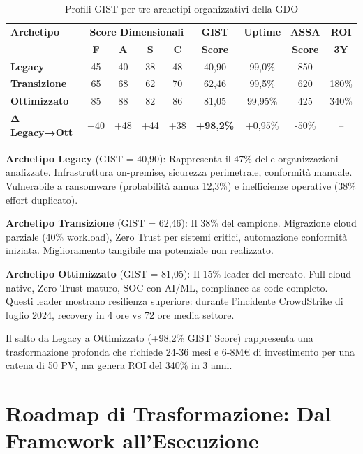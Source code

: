 \begin{table}[htbp]
\centering
\caption{Profili GIST per tre archetipi organizzativi della GDO}
\label{tab:gist_archetypes}
\begin{tabular}{@{}lcccccccc@{}}
\toprule
\textbf{Archetipo} & \multicolumn{4}{c}{\textbf{Score Dimensionali}} & \textbf{GIST} & \textbf{Uptime} & \textbf{ASSA} & \textbf{ROI} \\
& \textbf{F} & \textbf{A} & \textbf{S} & \textbf{C} & \textbf{Score} & & \textbf{Score} & \textbf{3Y} \\
\midrule
\textbf{Legacy} & 45 & 40 & 38 & 48 & 40,90 & 99,0\% & 850 & -- \\
\textbf{Transizione} & 65 & 68 & 62 & 70 & 62,46 & 99,5\% & 620 & 180\% \\
\textbf{Ottimizzato} & 85 & 88 & 82 & 86 & 81,05 & 99,95\% & 425 & 340\% \\
\midrule
\textbf{Δ Legacy→Ott} & +40 & +48 & +44 & +38 & \textbf{+98,2\%} & +0,95\% & -50\% & -- \\
\bottomrule
\end{tabular}
\end{table}

\textbf{Archetipo Legacy} (GIST = 40,90): Rappresenta il 47\% delle organizzazioni analizzate. Infrastruttura on-premise, sicurezza perimetrale, conformità manuale. Vulnerabile a ransomware (probabilità annua 12,3\%) e inefficienze operative (38\% effort duplicato).

\textbf{Archetipo Transizione} (GIST = 62,46): Il 38\% del campione. Migrazione cloud parziale (40\% workload), Zero Trust per sistemi critici, automazione conformità iniziata. Miglioramento tangibile ma potenziale non realizzato.

\textbf{Archetipo Ottimizzato} (GIST = 81,05): Il 15\% leader del mercato. Full cloud-native, Zero Trust maturo, SOC con AI/ML, compliance-as-code completo. Questi leader mostrano resilienza superiore: durante l'incidente CrowdStrike di luglio 2024, recovery in 4 ore vs 72 ore media settore.

Il salto da Legacy a Ottimizzato (+98,2\% GIST Score) rappresenta una trasformazione profonda che richiede 24-36 mesi e 6-8M€ di investimento per una catena di 50 PV, ma genera ROI del 340\% in 3 anni.

\section{\texorpdfstring{Roadmap di Trasformazione: Dal Framework all'Esecuzione}{5.4 - Roadmap di Trasformazione}}
\label{sec:5.4}

